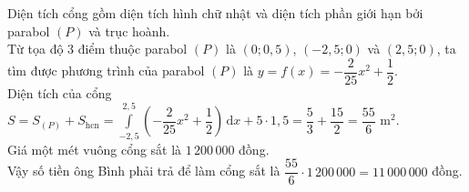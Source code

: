 \begin{ex}
{\begin{center}
\end{center}
Diện tích cổng gồm diện tích hình chữ nhật và diện tích phần giới hạn bởi parabol $(P)$ và trục hoành.\\
Từ tọa độ $3$ điểm thuộc parabol $(P)$ là $(0;0{,}5)$, $(-2{,}5;0)$ và $(2{,}5;0)$, ta tìm được phương trình của parabol $(P)$ là $y=f(x)=-\dfrac{2}{25}x^2+\dfrac{1}{2}$.\\
Diện tích của cổng $S=S_{(P)}+S_{\text{hcn}}=\displaystyle\int\limits_{-2{,}5}^{2{,}5}\left(-\dfrac{2}{25}x^2+\dfrac{1}{2}\right)\mathrm{\,d}x+5\cdot 1{,}5=\dfrac{5}{3}+\dfrac{15}{2}=\dfrac{55}{6}$ m$^2$.\\
Giá một mét vuông cổng sắt là $1\,200\,000$ đồng.\\
Vậy số tiền ông Bình phải trả để làm cổng sắt là $\dfrac{55}{6}\cdot 1\,200\,000=11\,000\,000$ đồng.
}
\end{ex}

